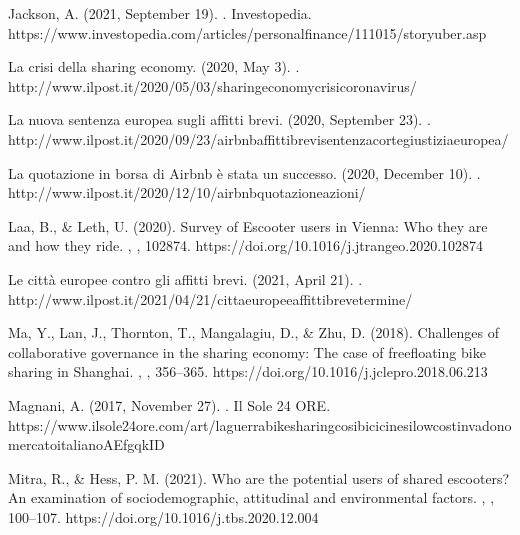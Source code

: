 \documentclass[letterpaper,10pt,english]{jupyterBook}
\begin{document}
\sphinxAtStartPar
Jackson, A. (2021, September 19). . Investopedia. https://www.investopedia.com/articles/personal\sphinxhyphen{}finance/111015/story\sphinxhyphen{}uber.asp

\sphinxAtStartPar
La crisi della sharing economy. (2020, May 3). . http://www.ilpost.it/2020/05/03/sharing\sphinxhyphen{}economy\sphinxhyphen{}crisi\sphinxhyphen{}coronavirus/

\sphinxAtStartPar
La nuova sentenza europea sugli affitti brevi. (2020, September 23). . http://www.ilpost.it/2020/09/23/airbnb\sphinxhyphen{}affitti\sphinxhyphen{}brevi\sphinxhyphen{}sentenza\sphinxhyphen{}corte\sphinxhyphen{}giustizia\sphinxhyphen{}europea/

\sphinxAtStartPar
La quotazione in borsa di Airbnb è stata un successo. (2020, December 10). . http://www.ilpost.it/2020/12/10/airbnb\sphinxhyphen{}quotazione\sphinxhyphen{}azioni/

\sphinxAtStartPar
Laa, B., \& Leth, U. (2020). Survey of E\sphinxhyphen{}scooter users in Vienna: Who they are and how they ride. , , 102874. https://doi.org/10.1016/j.jtrangeo.2020.102874

\sphinxAtStartPar
Le città europee contro gli affitti brevi. (2021, April 21). . http://www.ilpost.it/2021/04/21/citta\sphinxhyphen{}europee\sphinxhyphen{}affitti\sphinxhyphen{}breve\sphinxhyphen{}termine/

\sphinxAtStartPar
Ma, Y., Lan, J., Thornton, T., Mangalagiu, D., \& Zhu, D. (2018). Challenges of collaborative governance in the sharing economy: The case of free\sphinxhyphen{}floating bike sharing in Shanghai. , , 356–365. https://doi.org/10.1016/j.jclepro.2018.06.213

\sphinxAtStartPar
Magnani, A. (2017, November 27). . Il Sole 24 ORE. https://www.ilsole24ore.com/art/la\sphinxhyphen{}guerra\sphinxhyphen{}bike\sphinxhyphen{}sharing\sphinxhyphen{}cosi\sphinxhyphen{}bici\sphinxhyphen{}cinesi\sphinxhyphen{}low\sphinxhyphen{}cost\sphinxhyphen{}invadono\sphinxhyphen{}mercato\sphinxhyphen{}italiano\sphinxhyphen{}AEfgqkID

\sphinxAtStartPar
Mitra, R., \& Hess, P. M. (2021). Who are the potential users of shared e\sphinxhyphen{}scooters? An examination of socio\sphinxhyphen{}demographic, attitudinal and environmental factors. , , 100–107. https://doi.org/10.1016/j.tbs.2020.12.004
\end{document}
